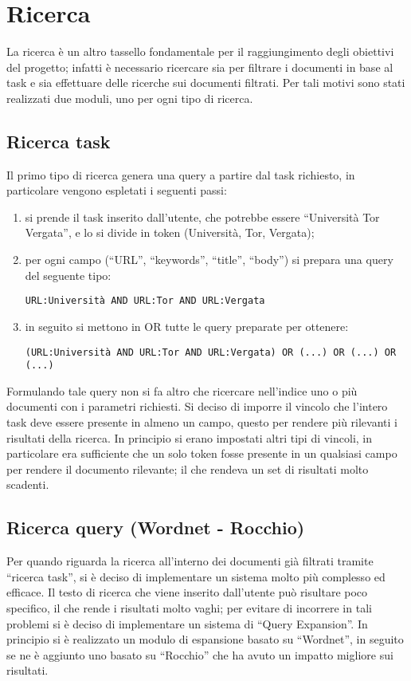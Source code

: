\section{Ricerca}\label{cap:retrival:searcher}
La ricerca è un altro tassello fondamentale per il raggiungimento degli obiettivi del progetto; infatti è necessario ricercare sia per filtrare i documenti in base al task e sia effettuare delle ricerche sui documenti filtrati. Per tali motivi sono stati realizzati due moduli, uno per ogni tipo di ricerca.
\subsection{Ricerca task}
Il primo tipo di ricerca genera una query a partire dal task richiesto, in particolare vengono espletati i seguenti passi:
\begin{enumerate}
\item si prende il task inserito dall'utente, che potrebbe essere ``Università Tor Vergata'', e lo si divide in token (Università, Tor, Vergata);
\item per ogni campo (``URL'', ``keywords'', ``title'', ``body'') si prepara una query del seguente tipo:
\begin{center}
\texttt{URL:Università AND URL:Tor AND URL:Vergata}
\end{center}
\item in seguito si mettono in OR tutte le query preparate per ottenere:
\begin{center}
\texttt{(URL:Università AND URL:Tor AND URL:Vergata) OR (...) OR (...) OR (...)}
\end{center}
\end{enumerate}
Formulando tale query non si fa altro che ricercare nell'indice uno o più documenti con i parametri richiesti. Si deciso di imporre il vincolo che l'intero task deve essere presente in almeno un campo, questo per rendere più rilevanti i risultati della ricerca. In principio si erano impostati altri tipi di vincoli, in particolare era sufficiente che un solo token fosse presente in un qualsiasi campo per rendere il documento rilevante; il che rendeva un set di risultati molto scadenti.
\subsection{Ricerca query (Wordnet - Rocchio)}
Per quando riguarda la ricerca all'interno dei documenti già filtrati tramite ``ricerca task'', si è deciso di implementare un sistema molto più complesso ed efficace. Il testo di ricerca che viene inserito dall'utente può risultare poco specifico, il che rende i risultati molto vaghi; per evitare di incorrere in tali problemi si è deciso di implementare un sistema di ``Query Expansion''. In principio si è realizzato un modulo di espansione basato su ``Wordnet'', in seguito se ne è aggiunto uno basato su ``Rocchio'' che ha avuto un impatto migliore sui risultati.
